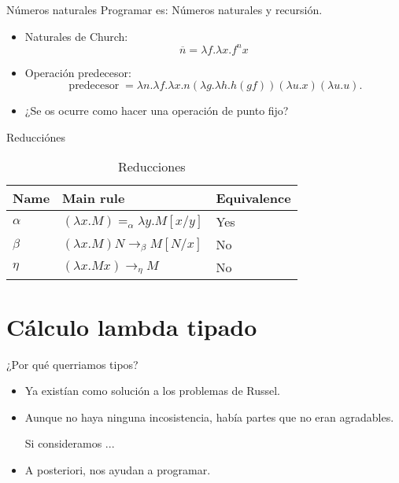 \documentclass[usenames,dvipsnames]{beamer}
\begin{document}
\begin{frame}{Números naturales}
  Programar es: Números naturales y recursión.
  \begin{itemize}
  \item Naturales de Church:
    $$\overline n = \lambda f.\lambda x. f^n x$$
  \item Operación predecesor:
    $$\operatorname{predecesor} =\lambda n.\lambda f.\lambda x. n (\lambda g.\lambda h. h (g f)) (\lambda u.x) (\lambda u.u). $$
  \item ¿Se os ocurre como hacer una operación de punto fijo?
  \end{itemize}
\end{frame}


\begin{frame}{Reducciónes}
  \begin{table}[h]
    \begin{center}
      \begin{tabular}{|l|l|l|}
        \hline
        Name & Main rule & Equivalence \\
        \hline
        $\alpha$ & $ (\lambda x. M) =_\alpha \lambda y. M[x/y]$& Yes\\
        $\beta$ & $(\lambda x.M)N \to_\beta M[N/x]$& No\\
        $\eta$ & ${\displaystyle (\lambda x.Mx) \to_\eta M }$& No\\
        \hline
      \end{tabular}
    \end{center}
    \caption{\label{tab:reductions}Reducciones}
  \end{table}

\end{frame}

\section{Cálculo lambda tipado}
\begin{frame}{¿Por qué querriamos tipos?}
  \begin{itemize}
  \item Ya existían como solución a los problemas de Russel.
  \item Aunque no haya ninguna incosistencia, había partes que no eran agradables.
    \begin{example}
      Si consideramos ...
    \end{example}
  \item A posteriori, nos ayudan a programar. 
  \end{itemize}
\end{frame}
\end{document}
